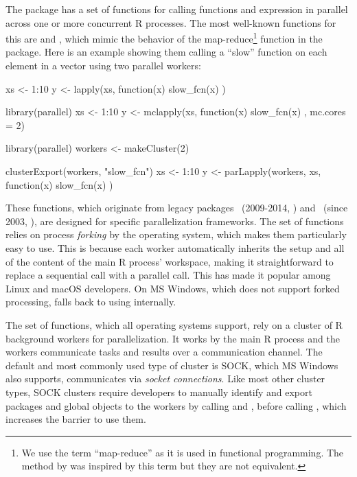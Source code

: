 The  package has a set of functions for calling
functions and expression in parallel across one or more concurrent R
processes. The most well-known functions for this
are  and , which mimic the behavior
of the map-reduce\footnote{We use the term ``map-reduce'' as it is
used in functional programming. The  method by
\citet{DeanGhemawat2004} was inspired by this term but they are not
equivalent.}
function  in the  package.  Here is an
example showing them calling a ``slow'' function on each element in a
vector using two parallel workers:
%
\begin{example}
xs <- 1:10
y <- lapply(xs, function(x) {
  slow_fcn(x)
})

library(parallel)
xs <- 1:10
y <- mclapply(xs, function(x) {
  slow_fcn(x)
}, mc.cores = 2)

library(parallel)
workers <- makeCluster(2)

clusterExport(workers, "slow_fcn")
xs <- 1:10
y <- parLapply(workers, xs, function(x) {
  slow_fcn(x)
})
\end{example}
%
These functions, which originate from legacy packages
~(2009-2014, \citet{CRAN:multicore}) and
~(since 2003, \citet{CRAN:snow}), are designed for
specific parallelization frameworks. The  set of
functions relies on process \emph{forking} by the operating system,
which makes them particularly easy to use.  This is because each
worker automatically inherits the setup and all of the content of the
main R process' workspace, making it straightforward to replace a
sequential
 call with a parallel  call. This
has made it popular among Linux and macOS developers. On MS Windows,
which does not support forked processing,  falls back
to using  internally.

The  set of functions, which all operating systems
support, rely on a cluster of R background workers for
parallelization. It works by the main R process and the workers
communicate tasks and results over a communication channel. The
default and most commonly used type of cluster is SOCK, which MS
Windows also supports, communicates via \emph{socket connections}. Like
most other cluster types, SOCK clusters require developers to manually
identify and export packages and global objects to the workers by
calling  and
, before calling , which
increases the barrier to use them.

